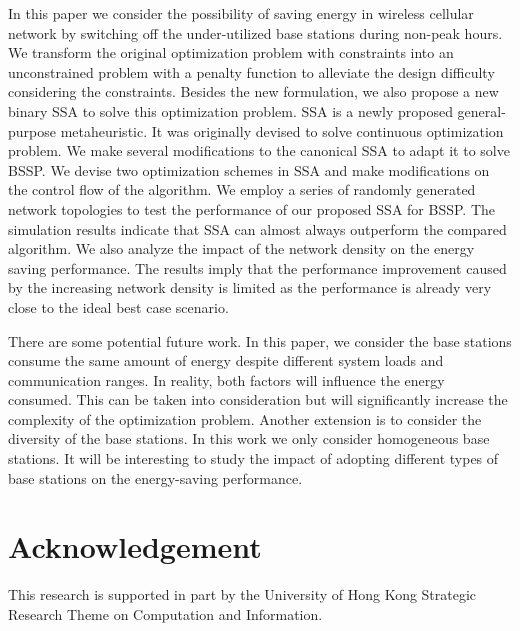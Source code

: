 \documentclass[conference]{IEEEtran}
\begin{document}
In this paper we consider the possibility of saving energy in wireless cellular network by switching off the under-utilized base stations during non-peak hours. We transform the original optimization problem with constraints into an unconstrained problem with a penalty function to alleviate the design difficulty considering the constraints. Besides the new formulation, we also propose a new binary SSA to solve this optimization problem. SSA is a newly proposed general-purpose metaheuristic. It was originally devised to solve continuous optimization problem. We make several modifications to the canonical SSA to adapt it to solve BSSP. We devise two optimization schemes in SSA and make modifications on the control flow of the algorithm. We employ a series of randomly generated network topologies to test the performance of our proposed SSA for BSSP. The simulation results indicate that SSA can almost always outperform the compared algorithm. We also analyze the impact of the network density on the energy saving performance. The results imply that the performance improvement caused by the increasing network density is limited as the performance is already very close to the ideal best case scenario.

There are some potential future work. In this paper, we consider the base stations consume the same amount of energy despite different system loads and communication ranges. In reality, both factors will influence the energy consumed. This can be taken into consideration but will significantly increase the complexity of the optimization problem. Another extension is to consider the diversity of the base stations. In this work we only consider homogeneous base stations. It will be interesting to study the impact of adopting different types of base stations on the energy-saving performance.

\section*{Acknowledgement}
This research is supported in part by the University of Hong Kong Strategic Research Theme on Computation and Information.



\end{document}
